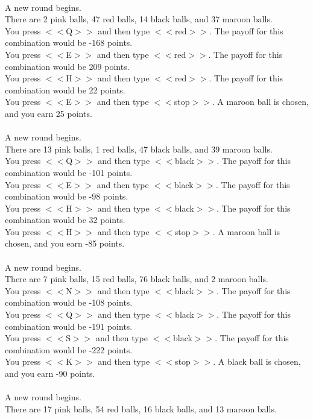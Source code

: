 \documentclass[pdflatex,sn-nature]{sn-jnl}%
\theoremstyle{thmstyleone}%
\theoremstyle{thmstyletwo}%
\theoremstyle{thmstylethree}%
\begin{document}
 $~$\\ 
A new round begins. $~$\\ 
There are 2 pink balls, 47 red balls, 14 black balls, and 37 maroon balls. $~$\\ 
You press $<<$Q$>>$ and then type $<<$red$>>$. The payoff for this combination would be -168 points. $~$\\ 
You press $<<$E$>>$ and then type $<<$red$>>$. The payoff for this combination would be 209 points. $~$\\ 
You press $<<$H$>>$ and then type $<<$red$>>$. The payoff for this combination would be 22 points. $~$\\ 
You press $<<$E$>>$ and then type $<<$stop$>>$. A maroon ball is chosen, and you earn 25 points. $~$\\ 
 $~$\\ 
A new round begins. $~$\\ 
There are 13 pink balls, 1 red balls, 47 black balls, and 39 maroon balls. $~$\\ 
You press $<<$Q$>>$ and then type $<<$black$>>$. The payoff for this combination would be -101 points. $~$\\ 
You press $<<$E$>>$ and then type $<<$black$>>$. The payoff for this combination would be -98 points. $~$\\ 
You press $<<$H$>>$ and then type $<<$black$>>$. The payoff for this combination would be 32 points. $~$\\ 
You press $<<$H$>>$ and then type $<<$stop$>>$. A maroon ball is chosen, and you earn -85 points. $~$\\ 
 $~$\\ 
A new round begins. $~$\\ 
There are 7 pink balls, 15 red balls, 76 black balls, and 2 maroon balls. $~$\\ 
You press $<<$N$>>$ and then type $<<$black$>>$. The payoff for this combination would be -108 points. $~$\\ 
You press $<<$Q$>>$ and then type $<<$black$>>$. The payoff for this combination would be -191 points. $~$\\ 
You press $<<$S$>>$ and then type $<<$black$>>$. The payoff for this combination would be -222 points. $~$\\ 
You press $<<$K$>>$ and then type $<<$stop$>>$. A black ball is chosen, and you earn -90 points. $~$\\ 
 $~$\\ 
A new round begins. $~$\\ 
There are 17 pink balls, 54 red balls, 16 black balls, and 13 maroon balls. $~$\\ 
\end{document}
